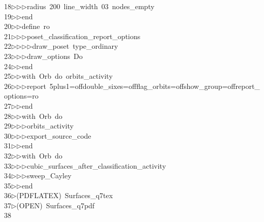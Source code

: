 \begin{tabbing}
18\>$\triangleright$\>$\triangleright$\>$\triangleright$\>radius\ 200\ line\_width\ 03\ nodes\_empty\ \\[0pt]
19\>$\triangleright$\>$\triangleright$\>end\ \\[0pt]
20\>$\triangleright$\>$\triangleright$\>define\ ro\ \\[0pt]
21\>$\triangleright$\>$\triangleright$\>$\triangleright$\>poset\_classification\_report\_options\ \\[0pt]
22\>$\triangleright$\>$\triangleright$\>$\triangleright$\>$\triangleright$\>draw\_poset\ type\_ordinary\ \\[0pt]
23\>$\triangleright$\>$\triangleright$\>$\triangleright$\>draw\_options\ Do\ \\[0pt]
24\>$\triangleright$\>$\triangleright$\>end\ \\[0pt]
25\>$\triangleright$\>$\triangleright$\>with\ Orb\ do\ orbits\_activity\ \\[0pt]
26\>$\triangleright$\>$\triangleright$\>$\triangleright$\>report\ 5plus1=offdouble\_sixes=offflag\_orbits=offshow\_group=offreport\_\\[0pt]
\>options=ro\ \\[0pt]
27\>$\triangleright$\>$\triangleright$\>end\ \\[0pt]
28\>$\triangleright$\>$\triangleright$\>with\ Orb\ do\ \\[0pt]
29\>$\triangleright$\>$\triangleright$\>$\triangleright$\>orbits\_activity\ \\[0pt]
30\>$\triangleright$\>$\triangleright$\>$\triangleright$\>export\_source\_code\ \\[0pt]
31\>$\triangleright$\>$\triangleright$\>end\ \\[0pt]
32\>$\triangleright$\>$\triangleright$\>with\ Orb\ do\ \\[0pt]
33\>$\triangleright$\>$\triangleright$\>$\triangleright$\>cubic\_surfaces\_after\_classification\_activity\ \\[0pt]
34\>$\triangleright$\>$\triangleright$\>$\triangleright$\>sweep\_Cayley\ \\[0pt]
35\>$\triangleright$\>$\triangleright$\>end\\[0pt]
36\>$\triangleright$\>(PDFLATEX)\ Surfaces\_q7tex\ \\[0pt]
37\>$\triangleright$\>(OPEN)\ Surfaces\_q7pdf\\[0pt]
38\>\end{tabbing}
